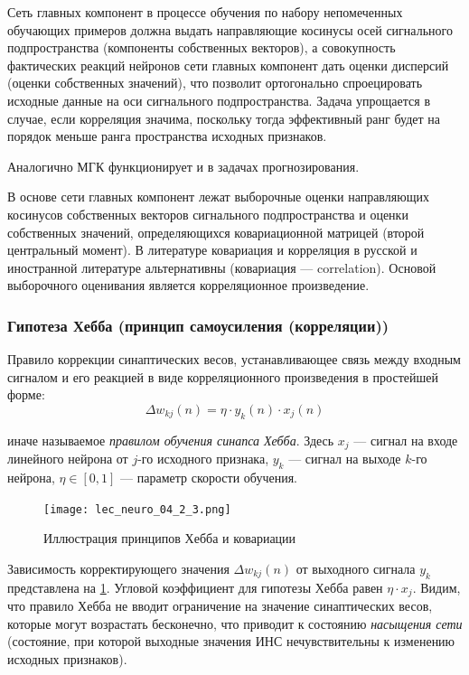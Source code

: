 \documentclass[a4paper]{article}
\numberwithin{equation}{subsection}
\begin{document}
Сеть главных компонент в процессе обучения по набору непомеченных обучающих примеров
должна выдать направляющие косинусы осей сигнального подпространства (компоненты собственных
векторов), а совокупность фактических реакций нейронов сети главных компонент дать оценки 
дисперсий (оценки собственных значений), что позволит ортогонально спроецировать исходные
данные на оси сигнального подпространства. 
Задача упрощается в случае, если корреляция значима, поскольку тогда эффективный ранг 
будет на порядок меньше ранга пространства исходных признаков.

Аналогично МГК функционирует и в задачах прогнозирования.

В основе сети главных компонент лежат выборочные оценки направляющих косинусов собственных
векторов сигнального подпространства и оценки собственных значений, определяющихся
ковариационной матрицей (второй центральный момент). В литературе ковариация и корреляция
в русской и иностранной литературе альтернативны (ковариация --- correlation).
Основой выборочного оценивания является корреляционное произведение.




\subsubsection{Гипотеза Хебба (принцип самоусиления (корреляции))}

Правило коррекции синаптических весов, устанавливающее связь между входным сигналом
и его реакцией в виде корреляционного произведения в простейшей форме:
\begin{equation}
    \Delta w_{kj} (n) = \eta \cdot y_k(n) \cdot x_j(n)
\end{equation}

\noindent
иначе называемое \textit{правилом обучения синапса Хебба}. 
Здесь $x_j$ --- сигнал на входе линейного нейрона от $j$-го исходного признака, $y_k$ --- 
сигнал на выходе $k$-го нейрона, $\eta \in \left[0, 1\right]$ --- параметр скорости
обучения.

\begin{figure}[htbp]
    \centering
    \texttt{[image: lec\_neuro\_04\_2\_3.png]}
    \caption{Иллюстрация принципов Хебба и ковариации}
    \label{lec_neuro_04_2_3}
\end{figure}

Зависимость корректирующего значения $\Delta w_{kj} (n)$ от выходного сигнала $y_k$
представлена на \ref{lec_neuro_04_2_3}. Угловой коэффициент для гипотезы Хебба равен
$\eta \cdot x_j$.
Видим, что правило Хебба не вводит ограничение на значение синаптических весов, которые могут 
возрастать бесконечно, что приводит к состоянию \textit{насыщения сети} 
(состояние, при которой выходные значения ИНС нечувствительны к изменению исходных признаков).
\end{document}
